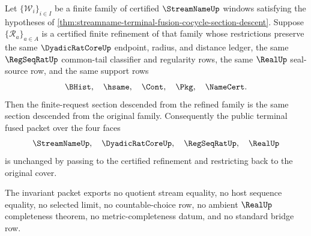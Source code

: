 \begin{theorem}
\label{thm:streamname-terminal-fusion-refinement-invariance}
Let $\{\mathcal W_i\}_{i\in I}$ be a finite family of certified
$\StreamNameUp$ windows satisfying the hypotheses of
\autoref{thm:streamname-terminal-fusion-cocycle-section-descent}. Suppose
$\{\mathcal R_a\}_{a\in A}$ is a certified finite refinement of that family
whose restrictions preserve the same $\DyadicRatCoreUp$ endpoint, radius, and
distance ledger, the same $\RegSeqRatUp$ common-tail classifier and regularity
rows, the same $\RealUp$ seal-source row, and the same support rows
$$
\BHist,\quad \hsame,\quad \Cont,\quad \Pkg,\quad \NameCert.
$$
Then the finite-request section descended from the refined family is the same
section descended from the original family. Consequently the public terminal
fused packet over the four faces
$$
\StreamNameUp,\quad \DyadicRatCoreUp,\quad \RegSeqRatUp,\quad \RealUp
$$
is unchanged by passing to the certified refinement and restricting back to the
original cover.

The invariant packet exports no quotient stream equality, no host sequence
equality, no selected limit, no countable-choice row, no ambient $\RealUp$
completeness theorem, no metric-completeness datum, and no standard bridge row.
\end{theorem}
